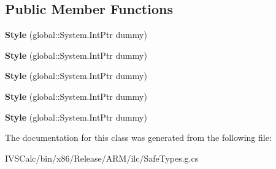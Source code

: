 \subsection*{Public Member Functions}
\begin{DoxyCompactItemize}
\item 
\mbox{\label{class_windows_1_1_u_i_1_1_xaml_1_1_style_ab310b61dc3c2d08d8e0890f0438305d4}} 
{\bfseries Style} (global\+::\+System.\+Int\+Ptr dummy)
\item 
\mbox{\label{class_windows_1_1_u_i_1_1_xaml_1_1_style_ab310b61dc3c2d08d8e0890f0438305d4}} 
{\bfseries Style} (global\+::\+System.\+Int\+Ptr dummy)
\item 
\mbox{\label{class_windows_1_1_u_i_1_1_xaml_1_1_style_ab310b61dc3c2d08d8e0890f0438305d4}} 
{\bfseries Style} (global\+::\+System.\+Int\+Ptr dummy)
\item 
\mbox{\label{class_windows_1_1_u_i_1_1_xaml_1_1_style_ab310b61dc3c2d08d8e0890f0438305d4}} 
{\bfseries Style} (global\+::\+System.\+Int\+Ptr dummy)
\item 
\mbox{\label{class_windows_1_1_u_i_1_1_xaml_1_1_style_ab310b61dc3c2d08d8e0890f0438305d4}} 
{\bfseries Style} (global\+::\+System.\+Int\+Ptr dummy)
\end{DoxyCompactItemize}


The documentation for this class was generated from the following file\+:\begin{DoxyCompactItemize}
\item 
I\+V\+S\+Calc/bin/x86/\+Release/\+A\+R\+M/ilc/Safe\+Types.\+g.\+cs\end{DoxyCompactItemize}
